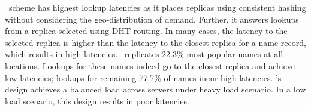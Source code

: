 {\codons\ scheme has highest lookup latencies as it places replicas using consistent hashing without considering the geo-distribution of demand. Further, it answers lookups from a replica selected using DHT routing. In many cases, the latency to the selected replica  is higher than the latency to the closest replica for a name record, which results in high latencies. 
\codons\ replicates 22.3\%   most popular names at all locations. Lookups for these names indeed go to the closest replica and achieve low latencies; lookups for remaining 77.7\% of names incur high latencies. \codons's design achieves a balanced load across servers under heavy load scenario. In a low  load scenario, this design results in poor latencies.









}
